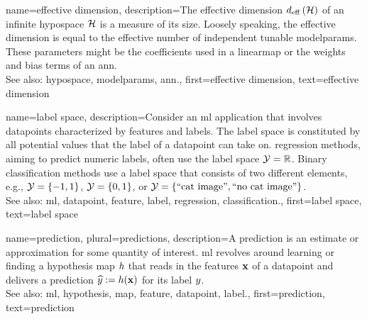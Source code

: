 {name={effective dimension},
	description={The effective dimension $d_{\rm eff} \left( \mathcal{H} \right)$ of 
		an infinite \gls{hypospace} $\mathcal{H}$ is a measure of its size. Loosely speaking, the 
		effective dimension is equal to the effective number of independent tunable \gls{modelparams}. 
		These \glspl{parameter} might be the coefficients used in a \gls{linearmap} or the 
		\gls{weights} and \gls{bias} terms of an \gls{ann}.
					\\ 
		See also: \gls{hypospace}, \gls{modelparams}, \gls{ann}.},
	first={effective dimension},
	text={effective dimension}  
}

{name={label space},
	description={Consider an \gls{ml} application that involves \glspl{datapoint} characterized by \glspl{feature} 
		and \glspl{label}. The \gls{label} space is constituted by all potential values that the \gls{label} 
		of a \gls{datapoint} can take on. \Gls{regression} methods, aiming to predict numeric \glspl{label}, often
		 use the \gls{label} space $\mathcal{Y} = \mathbb{R}$. Binary \gls{classification} methods use a \gls{label} space 
 		that consists of two different elements, e.g., $\mathcal{Y} =\{-1,1\}$, $\mathcal{Y}=\{0,1\}$, 
		or $\mathcal{Y} = \{ \mbox{``cat image''}, \mbox{``no cat image''} \}$.
					\\ 
		See also: \gls{ml}, \gls{datapoint}, \gls{feature}, \gls{label}, \gls{regression}, \gls{classification}.}, 
	first={label space},
	text={label space}  
}

{name={prediction}, plural={predictions},
	description={A prediction is an estimate or approximation for some 
		quantity of interest. \Gls{ml} revolves around learning or finding a \gls{hypothesis} \gls{map} $h$ 
		that reads in the \glspl{feature} ${\bf x}$ of a \gls{datapoint} and delivers a prediction 
		$\widehat{y} := h({\bf x})$ for its \gls{label} $y$.
					\\ 
		See also: \gls{ml}, \gls{hypothesis}, \gls{map}, \gls{feature}, \gls{datapoint}, \gls{label}.},
	first={prediction},
	text={prediction}  
}


